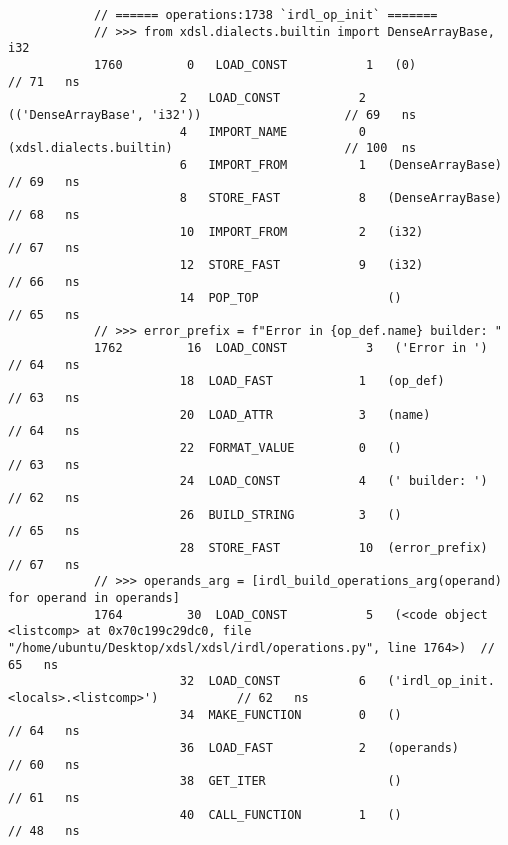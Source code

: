 \begin{code}
\begin{verbatim}
            // ====== operations:1738 `irdl_op_init` =======
            // >>> from xdsl.dialects.builtin import DenseArrayBase, i32
            1760         0   LOAD_CONST           1   (0)                                           // 71   ns
                        2   LOAD_CONST           2   (('DenseArrayBase', 'i32'))                    // 69   ns
                        4   IMPORT_NAME          0   (xdsl.dialects.builtin)                        // 100  ns
                        6   IMPORT_FROM          1   (DenseArrayBase)                               // 69   ns
                        8   STORE_FAST           8   (DenseArrayBase)                               // 68   ns
                        10  IMPORT_FROM          2   (i32)                                          // 67   ns
                        12  STORE_FAST           9   (i32)                                          // 66   ns
                        14  POP_TOP                  ()                                             // 65   ns
            // >>> error_prefix = f"Error in {op_def.name} builder: "
            1762         16  LOAD_CONST           3   ('Error in ')                                 // 64   ns
                        18  LOAD_FAST            1   (op_def)                                       // 63   ns
                        20  LOAD_ATTR            3   (name)                                         // 64   ns
                        22  FORMAT_VALUE         0   ()                                             // 63   ns
                        24  LOAD_CONST           4   (' builder: ')                                 // 62   ns
                        26  BUILD_STRING         3   ()                                             // 65   ns
                        28  STORE_FAST           10  (error_prefix)                                 // 67   ns
            // >>> operands_arg = [irdl_build_operations_arg(operand) for operand in operands]
            1764         30  LOAD_CONST           5   (<code object <listcomp> at 0x70c199c29dc0, file "/home/ubuntu/Desktop/xdsl/xdsl/irdl/operations.py", line 1764>)  // 65   ns
                        32  LOAD_CONST           6   ('irdl_op_init.<locals>.<listcomp>')           // 62   ns
                        34  MAKE_FUNCTION        0   ()                                             // 64   ns
                        36  LOAD_FAST            2   (operands)                                     // 60   ns
                        38  GET_ITER                 ()                                             // 61   ns
                        40  CALL_FUNCTION        1   ()                                             // 48   ns


\end{verbatim}
\end{code}

